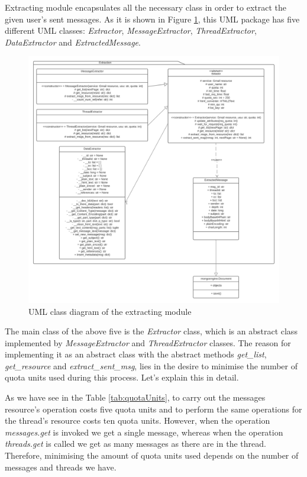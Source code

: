 Extracting module encapsulates all the necessary class in order to extract the given user's sent messages. As it is shown in Figure \ref{fig:umlext}, this UML package has five different UML classes: \textit{Extractor}, \textit{MessageExtractor}, \textit{ThreadExtractor}, \textit{DataExtractor} and \textit{ExtractedMessage}.

\begin{figure}[p]
	\centering%
	\centerline{\includegraphics[width=0.95\paperwidth]{Imagenes/Bitmap/extractionUML.png}}%
	\caption{UML class diagram of the extracting module}%
	\label{fig:umlext}
\end{figure}


The main class of the above five is the \textit{Extractor} class, which is an abstract class implemented by \textit{MessageExtractor} and \textit{ThreadExtractor} classes. The reason for implementing it as an abstract class with the abstract methods \textit{get\_list}, \textit{get\_resource} and \textit{extract\_sent\_msg}, lies in the desire to minimise the number of quota units used during this process. Let's explain this in detail.

As we have see in the Table \ref{tab:quotaUnits}, to carry out the messages resource's operation costs five quota units and to perform the same operations for the thread's resource costs ten quota units. However, when the operation \textit{messages.get} is invoked we get a single message, whereas when the operation \textit{threads.get} is called we get as many messages as there are in the thread. Therefore, minimising the amount of quota units used depends on the number of messages and threads we have.

